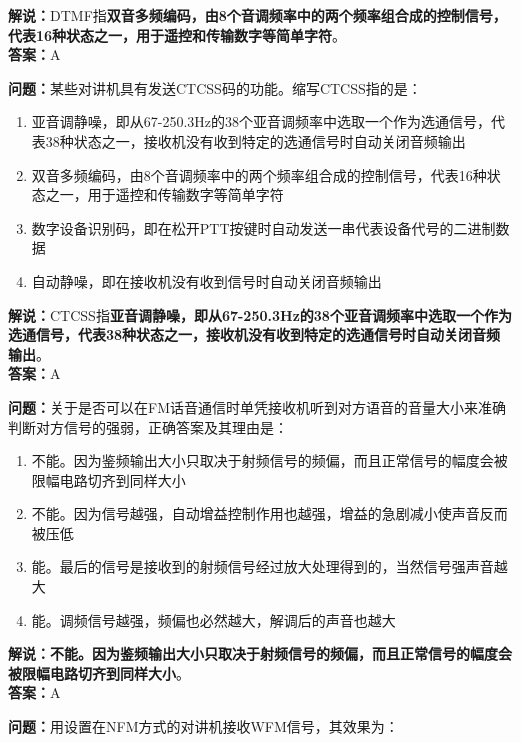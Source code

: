 \textbf{解说：}DTMF指\textbf{双音多频编码，由8个音调频率中的两个频率组合成的控制信号，代表16种状态之一，用于遥控和传输数字等简单字符}。\\\textbf{答案：}A%



\textbf{问题：}某些对讲机具有发送CTCSS码的功能。缩写CTCSS指的是：

\begin{enumerate}[label=\Alph*), leftmargin=1cm]
	\item 亚音调静噪，即从67-250.3Hz的38个亚音调频率中选取一个作为选通信号，代表38种状态之一，接收机没有收到特定的选通信号时自动关闭音频输出
	\item 双音多频编码，由8个音调频率中的两个频率组合成的控制信号，代表16种状态之一，用于遥控和传输数字等简单字符
	\item 数字设备识别码，即在松开PTT按键时自动发送一串代表设备代号的二进制数据
	\item 自动静噪，即在接收机没有收到信号时自动关闭音频输出
\end{enumerate}

\textbf{解说：}CTCSS指\textbf{亚音调静噪，即从67-250.3Hz的38个亚音调频率中选取一个作为选通信号，代表38种状态之一，接收机没有收到特定的选通信号时自动关闭音频输出}。\\\textbf{答案：}A%



\textbf{问题：}关于是否可以在FM话音通信时单凭接收机听到对方语音的音量大小来准确判断对方信号的强弱，正确答案及其理由是：

\begin{enumerate}[label=\Alph*), leftmargin=1cm]
	\item 不能。因为鉴频输出大小只取决于射频信号的频偏，而且正常信号的幅度会被限幅电路切齐到同样大小
	\item 不能。因为信号越强，自动增益控制作用也越强，增益的急剧减小使声音反而被压低
	\item 能。最后的信号是接收到的射频信号经过放大处理得到的，当然信号强声音越大
	\item 能。调频信号越强，频偏也必然越大，解调后的声音也越大
\end{enumerate}

\textbf{解说：不能。因为鉴频输出大小只取决于射频信号的频偏，而且正常信号的幅度会被限幅电路切齐到同样大小}。\\\textbf{答案：}A%



\textbf{问题：}用设置在NFM方式的对讲机接收WFM信号，其效果为：

